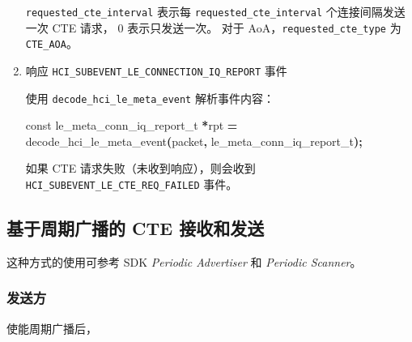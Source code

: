 \documentclass[
  12pt,
]{book}
\newenvironment{Shaded}{\begin{snugshade}}{\end{snugshade}}
\newcommand{\DataTypeTok}[1]{\textcolor[rgb]{0.13,0.29,0.53}{#1}}
\newcommand{\NormalTok}[1]{#1}
\newcommand{\OperatorTok}[1]{\textcolor[rgb]{0.81,0.36,0.00}{\textbf{#1}}}
\begin{document}
\begin{enumerate}
  \texttt{requested\_cte\_interval} 表示每 \texttt{requested\_cte\_interval} 个连接间隔发送一次 CTE 请求， \(0\) 表示只发送一次。
  对于 AoA，\texttt{requested\_cte\_type} 为 \texttt{CTE\_AOA}。
\item
  响应 \texttt{HCI\_SUBEVENT\_LE\_CONNECTION\_IQ\_REPORT} 事件

  使用 \texttt{decode\_hci\_le\_meta\_event} 解析事件内容：

\begin{Shaded}
\begin{Highlighting}[]
\DataTypeTok{const}\NormalTok{ le\_meta\_conn\_iq\_report\_t }\OperatorTok{*}\NormalTok{rpt }\OperatorTok{=}
\NormalTok{  decode\_hci\_le\_meta\_event}\OperatorTok{(}\NormalTok{packet}\OperatorTok{,}\NormalTok{ le\_meta\_conn\_iq\_report\_t}\OperatorTok{);}
\end{Highlighting}
\end{Shaded}

  如果 CTE 请求失败（未收到响应），则会收到 \texttt{HCI\_SUBEVENT\_LE\_CTE\_REQ\_FAILED} 事件。
\end{enumerate}

\hypertarget{misc-cte-periodic-adv}{%
\subsection{基于周期广播的 CTE 接收和发送}\label{misc-cte-periodic-adv}}

这种方式的使用可参考 SDK \emph{Periodic Advertiser} 和 \emph{Periodic Scanner}。

\hypertarget{ux53d1ux9001ux65b9-1}{%
\subsubsection{发送方}\label{ux53d1ux9001ux65b9-1}}

使能周期广播后，
\end{document}
